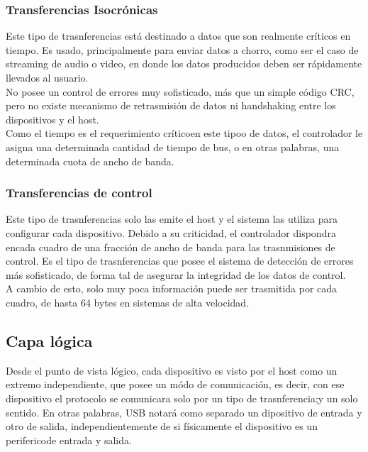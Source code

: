 	\subsubsection*{Transferencias Isocrónicas}
		Este tipo de trasnferencias está destinado a datos que son realmente críticos en tiempo. Es usado, principalmente para enviar datos a chorro, como ser el caso de streaming de audio o video, en donde los datos producidos deben ser rápidamente llevados al usuario.\\
	
		No posee un control de errores muy sofisticado, más que un simple código CRC, pero no existe mecanismo de retrasmisión de datos ni handshaking entre los dispositivos y el host.\\
	
		Como el tiempo es el requerimiento críticoen este tipoo de datos, el controlador le asigna una determinada cantidad de tiempo de bus, o en otras palabras, una determinada cuota de ancho de banda.\\
	
	\subsubsection*{Transferencias de control}
		Este tipo de trasnferencias solo las emite el host y el sistema las utiliza para configurar cada dispositivo. Debido a su criticidad, el controlador dispondra encada cuadro de una fracción de ancho de banda para las trasnmisiones de control. Es el tipo de trasnferencias que posee el sistema de detección de errores más sofisticado, de forma tal de asegurar la integridad de los datos de control.\\
	
		A cambio de esto, solo muy poca información puede ser trasmitida por cada cuadro, de hasta 64 bytes en sistemas de alta velocidad.\\
	
\subsection{Capa lógica}
	Desde el punto de vista lógico, cada dispositivo es visto por el host como un extremo independiente, que posee un módo de comunicación, es decir, con ese dispositivo el protocolo se comunicara solo por un tipo de trasnferencia;y un solo sentido. En otras palabras, USB notará como separado un dipositivo de entrada y otro de salida, independientemente de si físicamente el dispositivo es un perifericode entrada y salida.\\
	
